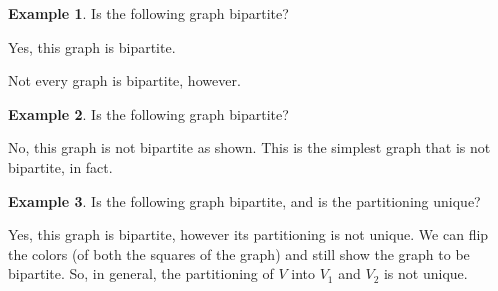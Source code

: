 \documentclass[]{article}
\theoremstyle{definition}
\newtheorem{ex}{Example}[section]
\begin{document}
			\begin{ex}
				Is the following graph bipartite?
				\begin{center}
				\end{center}
				Yes, this graph is bipartite.
			\end{ex}

			Not every graph is bipartite, however.
			\begin{ex}
				Is the following graph bipartite?
				\begin{center}
				\end{center}
				No, this graph is not bipartite as shown. This is the simplest graph that is not bipartite, in fact.
			\end{ex}

			\begin{ex}
				Is the following graph bipartite, and is the partitioning unique?
				\begin{center}
				\end{center}
				Yes, this graph is bipartite, however its partitioning is not unique. We can flip the colors (of both the squares of the graph) and still show the graph to be bipartite. So, in general, the partitioning of $V$ into $V_1$ and $V_2$ is not unique.
			\end{ex}
\end{document}
